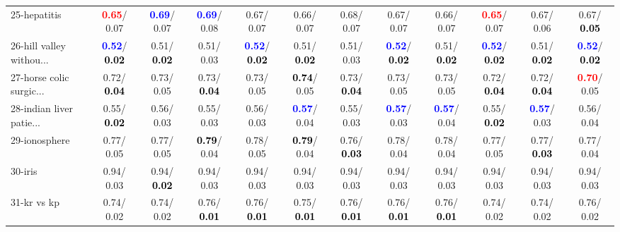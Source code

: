 \begin{table}[h]
\begin{center}
{\begin{tabular}{lc|c|c|c|c|c|c|c|c|c|c}
25-hepatitis & \textcolor{red}{\textbf{  0.65}}/  0.07 & \textcolor{blue}{\textbf{  0.69}}/  0.07 & \textcolor{blue}{\textbf{  0.69}}/  0.08 &   0.67/  0.07 &   0.66/  0.07 &   0.68/  0.07 &   0.67/  0.07 &   0.66/  0.07 & \textcolor{red}{\textbf{  0.65}}/  0.07 &   0.67/  0.06 &   0.67/\textcolor{black}{\textbf{  0.05}} \\
26-hill valley withou... & \textcolor{blue}{\textbf{  0.52}}/\textcolor{black}{\textbf{  0.02}} &   0.51/\textcolor{black}{\textbf{  0.02}} &   0.51/  0.03 & \textcolor{blue}{\textbf{  0.52}}/\textcolor{black}{\textbf{  0.02}} &   0.51/\textcolor{black}{\textbf{  0.02}} &   0.51/  0.03 & \textcolor{blue}{\textbf{  0.52}}/\textcolor{black}{\textbf{  0.02}} &   0.51/\textcolor{black}{\textbf{  0.02}} & \textcolor{blue}{\textbf{  0.52}}/\textcolor{black}{\textbf{  0.02}} &   0.51/\textcolor{black}{\textbf{  0.02}} & \textcolor{blue}{\textbf{  0.52}}/\textcolor{black}{\textbf{  0.02}} \\
27-horse colic surgic... &   0.72/\textcolor{black}{\textbf{  0.04}} &   0.73/  0.05 &   0.73/\textcolor{black}{\textbf{  0.04}} &   0.73/  0.05 & \textcolor{black}{\textbf{  0.74}}/  0.05 &   0.73/\textcolor{black}{\textbf{  0.04}} &   0.73/  0.05 &   0.73/  0.05 &   0.72/\textcolor{black}{\textbf{  0.04}} &   0.72/\textcolor{black}{\textbf{  0.04}} & \textcolor{red}{\textbf{  0.70}}/  0.05 \\
28-indian liver patie... &   0.55/\textcolor{black}{\textbf{  0.02}} &   0.56/  0.03 &   0.55/  0.03 &   0.56/  0.03 & \textcolor{blue}{\textbf{  0.57}}/  0.04 &   0.55/  0.03 & \textcolor{blue}{\textbf{  0.57}}/  0.03 & \textcolor{blue}{\textbf{  0.57}}/  0.04 &   0.55/\textcolor{black}{\textbf{  0.02}} & \textcolor{blue}{\textbf{  0.57}}/  0.03 &   0.56/  0.04 \\ \hline
29-ionosphere &   0.77/  0.05 &   0.77/  0.05 & \textcolor{black}{\textbf{  0.79}}/  0.04 &   0.78/  0.05 & \textcolor{black}{\textbf{  0.79}}/  0.04 &   0.76/\textcolor{black}{\textbf{  0.03}} &   0.78/  0.04 &   0.78/  0.04 &   0.77/  0.05 &   0.77/\textcolor{black}{\textbf{  0.03}} &   0.77/  0.04 \\
30-iris &   0.94/  0.03 &   0.94/\textcolor{black}{\textbf{  0.02}} &   0.94/  0.03 &   0.94/  0.03 &   0.94/  0.03 &   0.94/  0.03 &   0.94/  0.03 &   0.94/  0.03 &   0.94/  0.03 &   0.94/  0.03 &   0.94/  0.03 \\
31-kr vs kp &   0.74/  0.02 &   0.74/  0.02 &   0.76/\textcolor{black}{\textbf{  0.01}} &   0.76/\textcolor{black}{\textbf{  0.01}} &   0.75/\textcolor{black}{\textbf{  0.01}} &   0.76/\textcolor{black}{\textbf{  0.01}} &   0.76/\textcolor{black}{\textbf{  0.01}} &   0.76/\textcolor{black}{\textbf{  0.01}} &   0.74/  0.02 &   0.74/  0.02 &   0.76/  0.02 \\

\end{tabular}}
\end{center}
\end{table}
